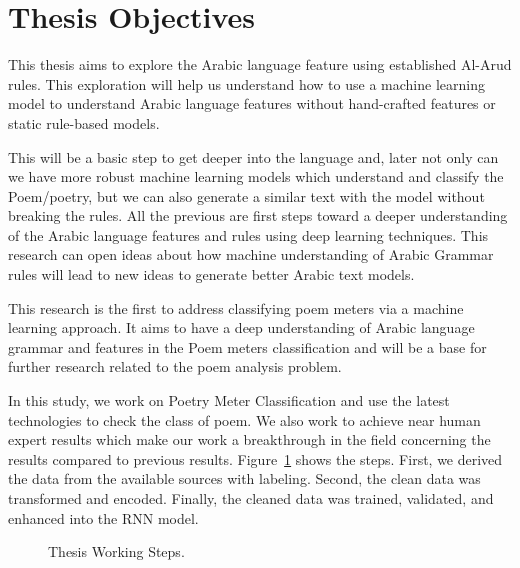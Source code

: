 \section{Thesis Objectives}
This thesis aims to explore the Arabic language feature using established Al-Arud rules. This exploration will help us understand how to use a machine learning model to understand Arabic language features without hand-crafted features or static rule-based models.

This will be a basic step to get deeper into the language and, later not only can we have more robust machine learning models which understand and classify the Poem/poetry, but we can also generate a similar text with the model without breaking the rules. All the previous are first steps toward a deeper understanding of the Arabic language features and rules using deep learning techniques. This research can open ideas about how machine understanding of Arabic Grammar rules will lead to new ideas to generate better Arabic text models.

This research is the first to address classifying poem meters via a machine learning approach. It aims to have a deep understanding of Arabic language grammar and features in the Poem meters classification and will be a base for further research related to the poem analysis problem.

In this study, we work on Poetry Meter Classification and use the latest technologies to check the class of poem. We also work to achieve near human expert results which make our work a breakthrough in the field concerning the results compared to previous results. Figure~\ref{Fig:Thesis_Cycle} shows the steps. First, we derived the data from the available sources with labeling. Second, the clean data was transformed and encoded. Finally, the cleaned data was trained, validated, and enhanced into the RNN model.

\begin{figure}[!t]
   
  \caption{Thesis Working Steps.}
  \label{Fig:Thesis_Cycle}
\end{figure}







